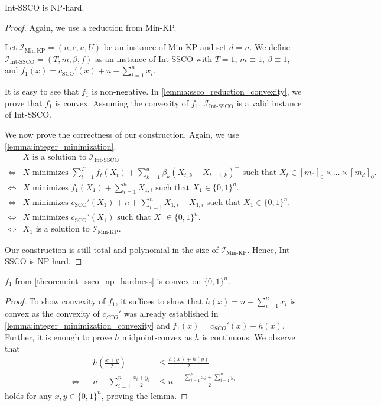 \begin{theorem}
\label{theorem:int_ssco_np_hardness}
Int-SSCO is NP-hard.
\end{theorem}
\begin{proof}
Again, we use a reduction from Min-KP.

Let $\mathcal{I}_{\text{Min-KP}} = (n, c, u, U)$ be an instance of Min-KP and set $d = n$. We define $\mathcal{I}_{\text{Int-SSCO}} = (T, m, \beta, f)$ as an instance of Int-SSCO with $T = 1$, $m \equiv 1$, $\beta \equiv 1$, and $f_1(x) = c_{\text{SCO}}'(x) + n - \sum_{i=1}^n x_i$.

It is easy to see that $f_1$ is non-negative. In \cref{lemma:ssco_reduction_convexity}, we prove that $f_1$ is convex. Assuming the convexity of $f_1$, $\mathcal{I}_{\text{Int-SSCO}}$ is a valid instance of Int-SSCO.

We now prove the correctness of our construction. Again, we use \cref{lemma:integer_minimization}. \begin{align*}
         &X \text{ is a solution to } \mathcal{I}_{\text{Int-SSCO}} \\
    \iff &X \text{ minimizes } \sum_{t=1}^T f_t(X_t) + \sum_{k=1}^d \beta_k (X_{t,k} - X_{t-1,k})^+ \text{ such that } X_t \in [m_0]_0 \times \dots \times [m_d]_0. \\
    \iff &X \text{ minimizes } f_1(X_1) + \sum_{i=1}^n X_{1,i} \text{ such that } X_1 \in \{0,1\}^n. \\
    \iff &X \text{ minimizes } c_{\text{SCO}}'(X_1) + n + \sum_{i=1}^n X_{1,i} - X_{1,i} \text{ such that } X_1 \in \{0,1\}^n. \\
    \iff &X \text{ minimizes } c_{\text{SCO}}'(X_1) \text{ such that } X_1 \in \{0,1\}^n. \\
    \iff &X_1 \text{ is a solution to } \mathcal{I}_{\text{Min-KP}}.
\end{align*}

Our construction is still total and polynomial in the size of $\mathcal{I}_{\text{Min-KP}}$. Hence, Int-SSCO is NP-hard.
\end{proof}

\begin{lemma}
\label{lemma:ssco_reduction_convexity}
$f_1$ from \cref{theorem:int_ssco_np_hardness} is convex on $\{0,1\}^n$.
\end{lemma}
\begin{proof}
To show convexity of $f_1$, it suffices to show that $h(x) = n - \sum_{i=1}^n x_i$ is convex as the convexity of $c_{SCO}'$ was already established in \cref{lemma:integer_minimization_convexity} and $f_1(x) = c_{SCO}'(x) + h(x)$. Further, it is enough to prove $h$ midpoint-convex as $h$ is continuous. We observe that \begin{align*}
         &&h\left(\frac{x + y}{2}\right) &\leq \frac{h(x) + h(y)}{2} \\
    \iff &&n - \sum_{i=1}^n \frac{x_i + y_i}{2} &\leq n - \frac{\sum_{i=1}^n x_i + \sum_{i=1}^n y_i}{2}
\end{align*} holds for any $x, y \in \{0,1\}^n$, proving the lemma.
\end{proof}

